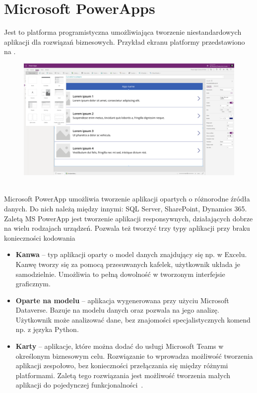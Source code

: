 \section{Microsoft PowerApps}
Jest to platforma programistyczna umożliwiająca tworzenie niestandardowych aplikacji dla rozwiązań biznesowych. Przykład ekranu platformy przedstawiono na .

\begin{figure}[H]
    \centering
    \includegraphics[width=\textwidth]{images/ms_powerapps}
    \label{fig:pa-plat}
\end{figure}
\ \\
Microsoft PowerApp umożliwia tworzenie aplikacji opartych o różnorodne źródła danych. Do nich należą między innymi: SQL Server, SharePoint, Dynamics 365. Zaletą MS PowerApp jest tworzenie aplikacji responsywnych, działających dobrze na wielu rodzajach urządzeń. Pozwala też tworzyć trzy typy aplikacji przy braku konieczności kodowania

\begin{itemize}
    \item \textbf{Kanwa} -- typ aplikacji oparty o model danych znajdujący się np. w Excelu. Kanwę tworzy się za pomocą przesuwanych kafelek, użytkownik układa je samodzielnie. Umożliwia to pełną dowolność w tworzonym interfejsie graficznym.

    \item \textbf{Oparte na modelu} -- aplikacja wygenerowana przy użyciu Microsoft Dataverse. Bazuje na modelu danych oraz pozwala na jego analizę. Użytkownik może analizować dane, bez znajomości specjalistycznych komend np. z języka Python.

    \item \textbf{Karty} -- aplikacje, które można dodać do usługi Microsoft Teams w określonym biznesowym celu. Rozwiązanie to wprowadza możliwość tworzenia aplikacji zespołowo, bez konieczności przełączania się między różnymi platformami. Zaletą tego rozwiązania jest możliwość tworzenia małych aplikacji do pojedynczej funkcjonalności~\cite{Microsoft,Microsofta,Microsoftb,Microsoftc}.
\end{itemize}

